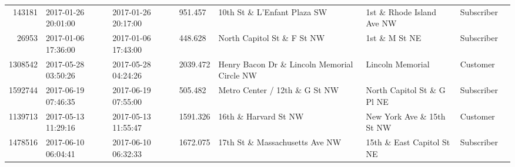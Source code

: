 \documentclass[11pt]{article}
\begin{document}
\begin{description}
\begin{tabular}{r|lllllll}
	  143181                                                 & 2017-01-26 20:01:00                                     & 2017-01-26 20:17:00                                     &  951.457                                                & 10th St \& L'Enfant Plaza SW                           & 1st \& Rhode Island Ave NW                             & Subscriber                                             \\
	   26953                                                 & 2017-01-06 17:36:00                                     & 2017-01-06 17:43:00                                     &  448.628                                                & North Capitol St \& F St NW                            & 1st \& M St NE                                         & Subscriber                                             \\
	 1308542                                               & 2017-05-28 03:50:26                                   & 2017-05-28 04:24:26                                   & 2039.472                                              & Henry Bacon Dr \& Lincoln Memorial Circle NW         & Lincoln Memorial                                      & Customer                                             \\
	 1592744                                                 & 2017-06-19 07:46:35                                     & 2017-06-19 07:55:00                                     &  505.482                                                & Metro Center / 12th \& G St NW                         & North Capitol St \& G Pl NE                            & Subscriber                                             \\
	 1139713                                                 & 2017-05-13 11:29:16                                     & 2017-05-13 11:55:47                                     & 1591.326                                                & 16th \& Harvard St NW                                  & New York Ave \& 15th St NW                             & Customer                                               \\
	 1478516                                                 & 2017-06-10 06:04:41                                     & 2017-06-10 06:32:33                                     & 1672.075                                                & 17th St \& Massachusetts Ave NW                        & 15th \& East Capitol St NE                             & Subscriber                                             \\

\end{tabular}
\end{description}
\end{document}
